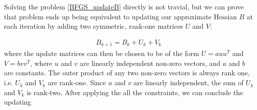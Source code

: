 Solving the problem \ref{BFGS_updateB} directly is not travial, but we can prove that problem ends up being equivalent to updating our approximate Hessian $B$ at each iteration by adding two symmetric, rank-one matrices $U$ and $V$:

\begin{align*}
 B_{k+1} = B_k + U_k + V_k
\end{align*}
where the update matrices can then be chosen to be of the form $U = a u u^T$ and $V = b v v^T$, where $u$ and $v$ are linearly independent non-zero vectors, and $a$ and $b$ are constants.  The outer product of any two non-zero vectors is always rank one, i.e. $U_k$ and $V_k$ are rank-one. Since $u$ and $v$ are linearly independent, the sum of $U_k$ and $V_k$ is rank-two. After applying the all the constraints, we can conclude the updating 





